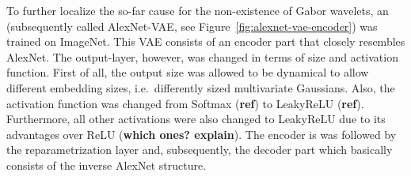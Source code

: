 To further localize the so-far cause for the non-existence of Gabor wavelets, an  (subsequently called AlexNet-VAE, see Figure~\ref{fig:alexnet-vae-encoder}) was trained on ImageNet.
This \ac{VAE} consists of an encoder part that closely resembles AlexNet.
The output-layer, however, was changed in terms of size and activation function.
First of all, the output size was allowed to be dynamical to allow different embedding sizes, i.e.\ differently sized multivariate Gaussians.
Also, the activation function was changed from Softmax (\textbf{ref}) to \ac{LeakyReLU} (\textbf{ref}).
Furthermore, all other activations were also changed to \ac{LeakyReLU} due to its advantages over \ac{ReLU} (\textbf{which ones? explain}).
The encoder is was followed by the reparametrization layer and, subsequently, the decoder part which basically consists of the inverse AlexNet structure.\par

